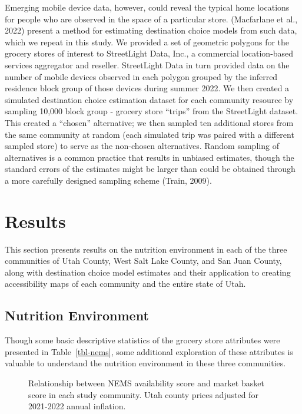 \documentclass[
  letterpaper,
  number,
  review,
  3p]{elsarticle}
\providecommand{\DIFadd}[1]{{\protect\color{blue}\uwave{#1}}} %
\providecommand{\DIFaddbegin}{} %
\providecommand{\DIFaddend}{} %
\newcommand{\DIFaddincludegraphics}[2][]{{\color{blue}\fbox{\DIFOincludegraphics[#1]{#2}}}} %
\DeclareRobustCommand{\DIFaddbegin}{\DIFOaddbegin \let\includegraphics\DIFaddincludegraphics} %
\DeclareRobustCommand{\DIFaddend}{\DIFOaddend \let\includegraphics\DIFOincludegraphics} %
\begin{document}
Emerging mobile device data, however, could reveal the typical home
locations for people who are observed in the space of a particular
store. (\DIFaddbegin \DIFadd{G. }\DIFaddend Macfarlane et al., 2022) present a method for estimating
destination choice models from such data, which we repeat in this study.
We provided a set of geometric polygons for the grocery stores of
interest to StreetLight Data, Inc., a commercial location-based services
aggregator and reseller. StreetLight Data in turn provided data on the
number of mobile devices observed in each polygon grouped by the
inferred residence block group of those devices during summer 2022. We
then created a simulated destination choice estimation dataset for each
community resource by sampling 10,000 block group - grocery store
``trips'' from the StreetLight dataset. This created a ``chosen''
alternative; we then sampled ten additional stores from the same
community at random (each simulated trip was paired with a different
sampled store) to serve as the non-chosen alternatives. Random sampling
of alternatives is a common practice that results in unbiased estimates,
though the standard errors of the estimates might be larger than could
be obtained through a more carefully designed sampling scheme (Train,
2009).


\section{Results}\label{sec-results}

This section presents results on the nutrition environment in each of
the three communities of Utah County, West Salt Lake County, and San
Juan County, along with destination choice model estimates and their
application to creating accessibility maps of each community and the
entire state of Utah.

\subsection{Nutrition Environment}\label{sec-nems}

Though some basic descriptive statistics of the grocery store attributes
were presented in Table~\ref{tbl-nems}, some additional exploration of
these attributes is valuable to understand the nutrition environment in
these three communities.

\begin{figure}


\caption{\label{fig-nems-market-avail}Relationship between NEMS
availability score and market basket score in each study community. Utah
county prices adjusted for 2021-2022 annual inflation.}

\end{figure}%
\end{document}

